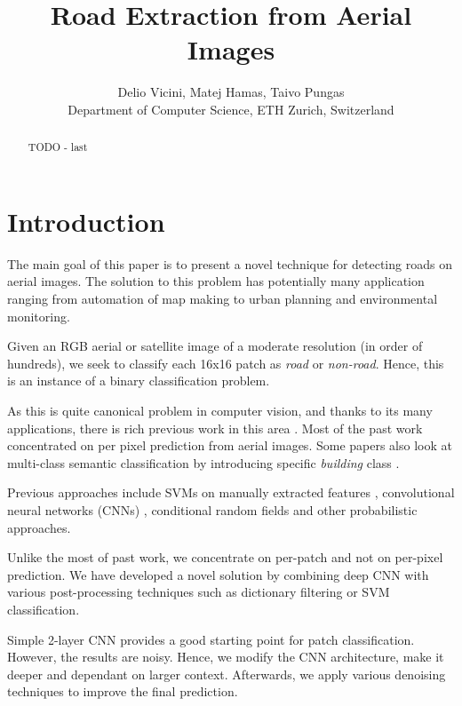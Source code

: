 \documentclass[10pt,conference,compsocconf]{IEEEtran}
\begin{document}
\title{Road Extraction from Aerial Images}
\author{
  Delio Vicini, Matej Hamas, Taivo Pungas\\
  Department of Computer Science, ETH Zurich, Switzerland
}

\maketitle

\begin{abstract}
  TODO - last
\end{abstract}

\section{Introduction}
\label{sec:intro}

The main goal of this paper is to present a novel technique for detecting roads on aerial images. The solution to this problem has potentially many application ranging from automation of map making to urban planning and environmental monitoring.

Given an RGB aerial or satellite image of a moderate resolution (in order of hundreds), we seek to classify each 16x16 patch as \textit{road} or \textit{non-road}. Hence, this is an instance of a binary classification problem.

As this is quite canonical problem in computer vision, and thanks to its many applications, there is rich previous work in this area \cite{Huang.2002} \cite{MnihThesis.2013} \cite{Long.2014} \cite{Montoya.2015} \cite{Saito.2015}. Most of the past work concentrated on per pixel prediction from aerial images. Some papers also look at multi-class semantic classification by introducing specific \textit{building} class \cite{Saito.2015}. 

Previous approaches include SVMs on manually extracted features \cite{Huang.2002}, convolutional neural networks (CNNs) \cite{Long.2014} \cite{Saito.2015}, conditional random fields \cite{Montoya.2015} and other probabilistic approaches.

Unlike the most of past work, we concentrate on per-patch and not on per-pixel prediction. We have developed a novel solution by combining deep CNN with various post-processing techniques such as dictionary filtering or SVM classification.

Simple 2-layer CNN provides a good starting point for patch classification.  However, the results are noisy. Hence, we modify the CNN architecture, make it deeper and dependant on larger context. Afterwards, we apply various denoising techniques to improve the final prediction. 
\end{document}
